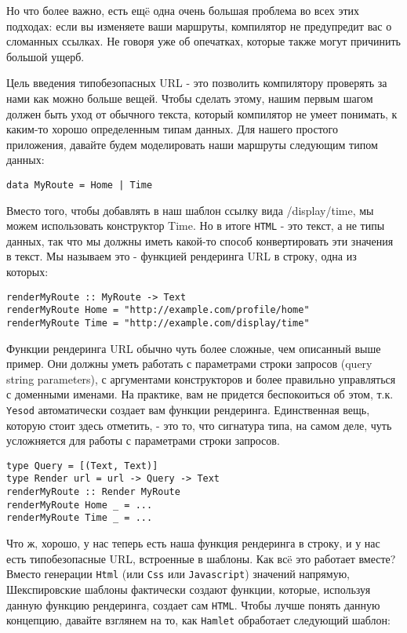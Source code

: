 Но что более важно, есть ещë одна очень большая проблема во всех этих подходах:
если вы изменяете ваши маршруты, компилятор не предупредит вас о сломанных
ссылках. Не говоря уже об опечатках, которые также могут причинить большой ущерб.

Цель введения типобезопасных URL - это позволить компилятору проверять за 
нами как можно больше вещей. Чтобы сделать этому, нашим первым шагом 
должен быть уход от обычного текста, который компилятор не умеет понимать, 
к каким-то хорошо определенным типам данных. Для нашего простого приложения,
давайте будем моделировать наши маршруты следующим типом данных:

\begin{lstlisting}
data MyRoute = Home | Time
\end{lstlisting}

Вместо того, чтобы добавлять в наш шаблон ссылку вида /display/time, мы можем
использовать конструктор Time. Но в итоге \texttt{HTML} - это текст, а не типы данных,
так что мы должны иметь какой-то способ конвертировать эти значения в текст.
Мы называем это - функцией рендеринга URL в строку, одна из которых:

\begin{lstlisting}
renderMyRoute :: MyRoute -> Text
renderMyRoute Home = "http://example.com/profile/home"
renderMyRoute Time = "http://example.com/display/time"
\end{lstlisting}

Функции рендеринга URL обычно чуть более сложные, чем описанный выше пример.
Они должны уметь работать с параметрами строки запросов (query string parameters),
с аргументами конструкторов и более правильно управляться с доменными именами.
На практике, вам не придется беспокоиться об этом, т.к. \texttt{Yesod} автоматически 
создает вам функции рендеринга. Единственная вещь, которую стоит здесь отметить,
 - это то, что сигнатура типа, на самом деле, чуть усложняется для 
работы с параметрами строки запросов.

\begin{lstlisting}
type Query = [(Text, Text)]                                                     
type Render url = url -> Query -> Text                                          
renderMyRoute :: Render MyRoute                                                 
renderMyRoute Home _ = ...                                                      
renderMyRoute Time _ = ...   
\end{lstlisting}

Что ж, хорошо, у нас теперь есть наша функция рендеринга в строку, и у нас есть
типобезопасные URL, встроенные в шаблоны. Как всë это работает вместе?
Вместо генерации \lstinline!Html! (или \lstinline!Css! или \lstinline!Javascript!) значений напрямую, 
Шекспировские шаблоны фактически создают функции, которые, используя данную
функцию рендеринга, создает сам \texttt{HTML}. Чтобы лучше понять данную концепцию,
давайте взглянем на то, как \texttt{Hamlet} обработает следующий шаблон:

